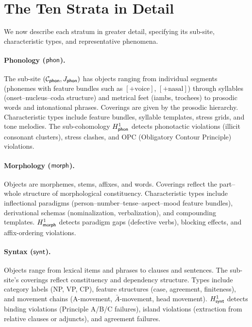 \section{The Ten Strata in Detail}
\label{sec:strata-detail}

We now describe each stratum in greater detail, specifying its
sub-site, characteristic types, and representative phenomena.

\paragraph{Phonology ($\mathsf{phon}$).}
The sub-site $(\mathcal{C}_{\mathsf{phon}}, J_{\mathsf{phon}})$ has objects ranging
from individual segments (phonemes with feature bundles such as
$[{+}\text{voice}]$, $[{+}\text{nasal}]$) through syllables
(onset--nucleus--coda structure) and metrical feet (iambs, trochees)
to prosodic words and intonational phrases.  Coverings are given by
the prosodic hierarchy.  Characteristic types include feature bundles,
syllable templates, stress grids, and tone melodies.  The sub-cohomology
$H^1_{\mathsf{phon}}$ detects phonotactic violations (illicit consonant
clusters), stress clashes, and OPC (Obligatory Contour Principle)
violations.

\paragraph{Morphology ($\mathsf{morph}$).}
Objects are morphemes, stems, affixes, and words.  Coverings reflect
the part--whole structure of morphological constituency.  Characteristic
types include inflectional paradigms (person--number--tense--aspect--mood
feature bundles), derivational schemas (nominalization, verbalization),
and compounding templates.  $H^1_{\mathsf{morph}}$ detects paradigm gaps
(defective verbs), blocking effects, and affix-ordering violations.

\paragraph{Syntax ($\mathsf{synt}$).}
Objects range from lexical items and phrases to clauses and sentences.
The sub-site's coverings reflect constituency and dependency structure.
Types include category labels (NP, VP, CP), feature structures
(case, agreement, finiteness), and movement chains (A-movement,
$\bar{A}$-movement, head movement).  $H^1_{\mathsf{synt}}$ detects binding
violations (Principle A/B/C failures), island violations (extraction
from relative clauses or adjuncts), and agreement failures.

